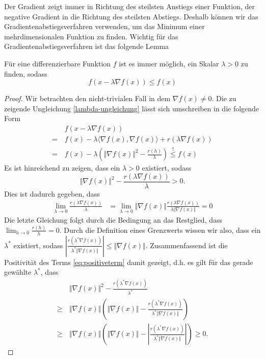 Der Gradient zeigt immer in Richtung des steilsten Anstiegs einer Funktion, der negative Gradient in die Richtung des steilsten Abstiegs. Deshalb k\"onnen wir das Gradientenabstiegsverfahren verwenden, um das Minimum einer mehrdimensionalen Funktion zu finden. Wichtig für das Gradientenabstiegsverfahren ist das folgende Lemma

\begin{Lem}
\label{lem:gradientabstieg}
F\"ur eine differenzierbare Funktion $f$ ist es immer m\"oglich, ein Skalar $\lambda>0$ zu finden, sodass
\begin{equation}
\label{lambda-ungleichung}
f(x - \lambda \nabla f(x)) \leq f(x)
\end{equation} 
\end{Lem}


\begin{proof}
Wir betrachten den nicht-trivialen Fall in dem $\nabla f(x) \neq 0$. 
Die zu zeigende Ungleichung \eqref{lambda-ungleichung} l\"asst sich umschreiben in die folgende Form
\begin{align*}
&f(x - \lambda \nabla f(x))\\
 = \, &f(x) - \lambda \langle \nabla f(x), \nabla f(x)\rangle + r(\lambda \nabla f(x)) \\
= \, &f(x) - \lambda \left( \Vert\nabla f(x)\Vert^2 - \frac{r(h)}{\lambda}\right) \overset{!}{\leq} f(x)
\end{align*}
Es ist hinreichend zu zeigen, dass ein $\lambda>0$ existiert, sodass
\begin{equation}
\label{eq:positiveterm}
\Vert\nabla f(x)\Vert^2 - \frac{r(\lambda \nabla f(x))}{\lambda} >0.
\end{equation}
  Dies ist dadurch gegeben, dass 
\begin{align*}
\lim_{\lambda\to 0} \frac{r(\lambda \nabla f(x))}{\lambda} &= \lim_{\lambda \to 0}\Vert\nabla f(x)\Vert \frac{r(\lambda \nabla f(x))}{\lambda \Vert\nabla f(x)\Vert}= 0
\end{align*}
Die letzte Gleichung folgt durch die Bedingung an das Restglied, dass $\lim_{h\to 0}\frac{r(h)}{h} = 0$. Durch die Definition eines Grenzwerts wissen wir also, dass ein $\lambda^*$ existiert, sodass $\left| \frac{r(\lambda^* \nabla f(x))}{\lambda^* \Vert\nabla f(x)\Vert} \right| \leq \Vert\nabla f(x)\Vert$. Zusammenfassend ist die Positivit\"at des Terms \eqref{eq:positiveterm} damit gezeigt, d.h. es gilt f\"ur das gerade gew\"ahlte $\lambda^*$, dass
\begin{align*}
&\Vert\nabla f(x)\Vert^2 - \frac{r(\lambda^* \nabla f(x))}{\lambda^*} \\
\geq \, &\Vert\nabla f(x)\Vert \left( \Vert \nabla f(x)\Vert - \frac{r (\lambda^* \nabla f(x))}{\lambda^* \Vert \nabla f(x)\Vert} \right) \\
\geq \, &\Vert \nabla f(x)\Vert \left(\Vert\nabla f(x)\Vert - \left| \frac{r (\lambda^* \nabla f(x))}{\lambda^* \Vert \nabla f(x)\Vert}\right| \right) \geq 0. 
\end{align*}
\end{proof}



